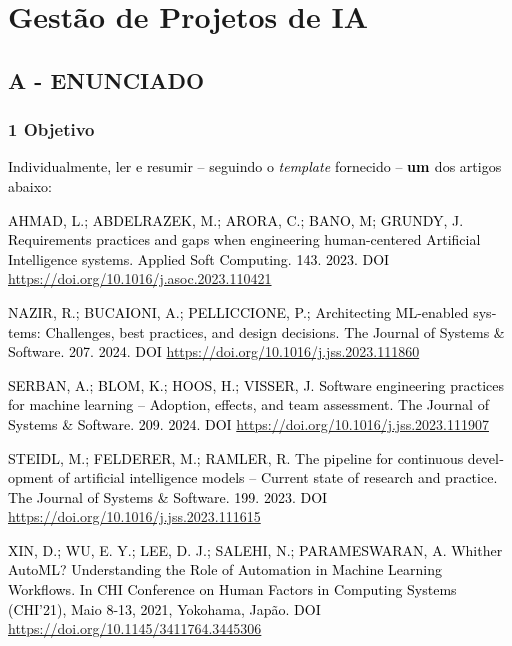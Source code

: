 \label{ap:ap12}
\chapter{Gestão de Projetos de IA}
\section*{\textbf{A - ENUNCIADO}}

\subsection*{\textbf{1 Objetivo}}

\textcolor{black}{Individualmente, ler e resumir – seguindo o }\textit{\textcolor{black}{template }}\textcolor{black}{
fornecido – }\textbf{\textcolor{black}{um }}\textcolor{black}{ dos artigos abaixo:}



\foreignlanguage{english}{\textcolor{black}{AHMAD, L.; ABDELRAZEK, M.; ARORA, C.; BANO, M; GRUNDY, J. Requirements
practices and gaps when engineering human-centered Artificial Intelligence systems. Applied Soft Computing. 143. 2023.
DOI }}\url{https://doi.org/10.1016/j.asoc.2023.110421}

\foreignlanguage{english}{\textcolor{black}{NAZIR, R.; BUCAIONI, A.; PELLICCIONE, P.; Architecting ML-enabled systems:
Challenges, best practices, and design decisions. The Journal of Systems \& Software. 207. 2024. DOI
}}\url{https://doi.org/10.1016/j.jss.2023.111860}\foreignlanguage{english}{\textcolor{black}{ }}

\foreignlanguage{english}{\textcolor{black}{SERBAN, A.; BLOM, K.; HOOS, H.; VISSER, J. Software engineering practices
for machine learning – Adoption, effects, and team assessment. The Journal of Systems \& Software. 209. 2024. DOI
}}\url{https://doi.org/10.1016/j.jss.2023.111907}\foreignlanguage{english}{\textcolor{black}{ }}

\foreignlanguage{english}{\textcolor{black}{STEIDL, M.; FELDERER, M.; RAMLER, R. The pipeline for continuous development
of artificial intelligence models – Current state of research and practice. The Journal of Systems \& Software. 199.
2023. DOI }}\url{https://doi.org/10.1016/j.jss.2023.111615}\foreignlanguage{english}{\textcolor{black}{ }}

\foreignlanguage{english}{\textcolor{black}{XIN, D.; WU, E. Y.; LEE, D. J.; SALEHI, N.; PARAMESWARAN, A. Whither AutoML?
Understanding the Role of Automation in Machine Learning Workflows. In CHI Conference on Human Factors in Computing
Systems (CHI'21), Maio 8-13, 2021, Yokohama, Japão. }}\textcolor{black}{DOI
}\url{https://doi.org/10.1145/3411764.3445306}\textcolor{black}{ }



